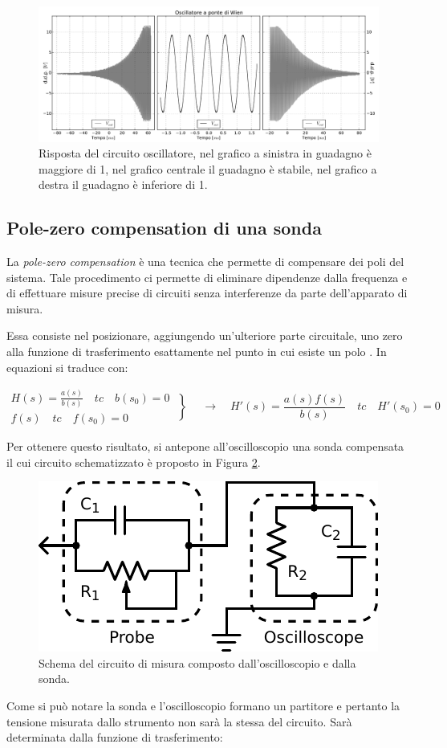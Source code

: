 \begin{figure}[htpc]
\centering
\includegraphics[width=.95\textwidth]{../E08/latex/grey_wien2.jpg}
\caption{Risposta del circuito oscillatore, nel grafico a sinistra in guadagno è maggiore di \num{1}, nel grafico centrale il guadagno è stabile, nel grafico a destra il guadagno è inferiore di \num{1}.}
\label{fig8:wien}
\end{figure}

\subsection{Pole-zero compensation di una sonda}

La \textit{pole-zero compensation} è una tecnica che permette di compensare dei poli del sistema. Tale procedimento ci permette di eliminare dipendenze dalla frequenza e di effettuare misure precise di circuiti senza interferenze da parte dell'apparato di misura.

Essa consiste nel posizionare, aggiungendo un'ulteriore parte circuitale, uno zero alla funzione di trasferimento esattamente nel punto in cui esiste un polo .
In equazioni si traduce con:

\[
  \begin{array}{lr}
H(s) = \frac{a(s)}{b(s)} \quad tc \quad b(s_0) = 0 \\
f(s) \quad tc \quad f(s_0) = 0
  \end{array}\left\}
\quad \longrightarrow \quad H'(s) = \frac{a(s)f(s)}{b(s)} \quad tc \quad H'(s_0) = 0
\right.
\]

Per ottenere questo risultato, si antepone all'oscilloscopio una sonda compensata il cui circuito schematizzato è proposto in Figura \ref{cir8:probe}.

\begin{figure}
\centering
\includegraphics[width=.35\textwidth]{../E08/latex/probe.pdf}
\caption{Schema del circuito di misura composto dall'oscilloscopio e dalla sonda.}
\label{cir8:probe}
\end{figure}
Come si può notare la sonda e l'oscilloscopio formano un partitore e pertanto la tensione misurata dallo strumento non sarà la stessa del circuito.
Sarà determinata dalla funzione di trasferimento:

